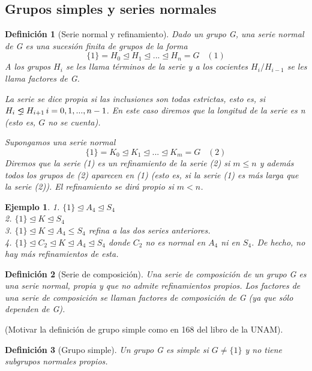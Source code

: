 \documentclass{article}
\theoremstyle{theorem-style}  %
\theoremstyle{definition-style}
\newtheorem{definition}{Definición}[section]
\theoremstyle{example-style}
\newtheorem{example}{Ejemplo}[section]
\newcommand{\propernormal}{%
  \mathrel{\ooalign{$\lneq$\cr\raise.22ex\hbox{$\lhd$}\cr}}}
\begin{document}
\subsection{Grupos simples y series normales}

\begin{definition}[Serie normal y refinamiento]
Dado un grupo G, una serie normal de G es una sucesión finita de grupos de la forma $$\{1\} = H_0 \trianglelefteq H_1 \trianglelefteq ... \trianglelefteq H_n = G \;\;\;(1)$$ A los grupos $H_i$ se les llama términos de la serie y a los cocientes $H_i/H_{i-1}$ se les llama factores de G.

La serie se dice propia si las inclusiones son todas estrictas, esto es, si $H_i \propernormal H_{i+1} \, i = 0,1,...,n-1$. En este caso diremos que la longitud  de la serie es n (esto es, $G$ no se cuenta).

Supongamos una serie normal $$\{1\} = K_0 \trianglelefteq K_1 \trianglelefteq ... \trianglelefteq K_m = G\;\;\;(2)$$ Diremos que la serie (1) es un refinamiento de la serie (2) si $m \le n$ y además todos los grupos de (2) aparecen en (1) (esto es, si la serie (1) es más larga que la serie (2)). El refinamiento se dirá propio si $m < n$.
\end{definition}

\begin{example}
1. $\{1\} \trianglelefteq A_4 \trianglelefteq S_4$\\
2. $\{1\} \trianglelefteq K \trianglelefteq S_4$\\
3. $\{1\} \trianglelefteq K \trianglelefteq A_4 \le S_4$ refina a las dos series anteriores.\\
4. $\{1\} \trianglelefteq C_2 \trianglelefteq K \trianglelefteq A_4 \trianglelefteq S_4$ donde $C_2$ no es normal en $A_4$ ni en $S_4$. De hecho, no hay más refinamientos de esta.
\end{example}

\begin{definition}[Serie de composición]
Una serie de composición de un grupo G es una serie normal, propia y que no admite refinamientos propios. Los factores de una serie de composición se llaman factores de composición de G (ya que sólo dependen de G).
\end{definition}

(Motivar la definición de grupo simple como en 168 del libro de la UNAM).

\begin{definition}[Grupo simple]
Un grupo G es simple si $G \neq \{1\}$ y no tiene subgrupos normales propios.
\end{definition}
\end{document}
